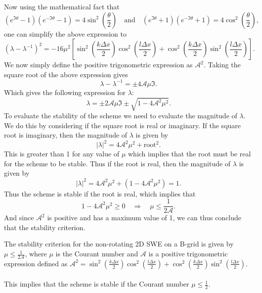 Now using the mathematical fact that 
\begin{equation}
    \left(e^{\mathfrak{I}\theta} - 1\right)\left(e^{-\mathfrak{I}\theta}-1\right) = 4\sin^2\left(\frac{\theta}{2}\right) \quad \text{and} \quad \left(e^{\mathfrak{I}\theta} + 1\right)\left(e^{-\mathfrak{I}\theta}+1\right) = 4\cos^2\left(\frac{\theta}{2}\right),
\end{equation}
one can simplify the above expression to
\begin{equation*}
(\lambda - \lambda^{-1})^2
= -16\mu^2 \left[
\sin^2\left(\frac{k\Delta x}{2}\right)\cos^2\left(\frac{l\Delta x}{2}\right)
+
\cos^2\left(\frac{k\Delta x}{2}\right)\sin^2\left(\frac{l\Delta x}{2}\right)
\right].
\end{equation*}
We now simply define the positive trigonometric expression as $\mathcal{A}^2$. 
Taking the square root of the above expression gives
\begin{equation*}
\lambda - \lambda^{-1} = \pm 4\mathcal{A}\mu \mathfrak{I}.
\end{equation*}
Which gives the following expression for $\lambda$:
\begin{equation*}
\lambda = \pm 2\mathcal{A}\mu \mathfrak{I} \pm \sqrt{1 - 4\mathcal{A}^2\mu^2}.
\end{equation*}
To evaluate the stability of the scheme we need to evaluate the magnitude of $\lambda$. We do this by considering if the square root is real or imaginary. If the square root is imaginary, then the magnitude of $\lambda$ is given by
\begin{equation*}
|\lambda|^2 = 4\mathcal{A}^2\mu^2 + \text{root}^2.
\end{equation*}
This is greater than 1 for any value of $\mu$ which implies that the root must be real for the scheme to be stable. Thus if the root is real, then the magnitude of $\lambda$ is given by
\begin{equation*}
|\lambda|^2 = 4\mathcal{A}^2\mu^2 + \left(1 - 4\mathcal{A}^2\mu^2\right) = 1.
\end{equation*}
Thus the scheme is stable if the root is real, which implies that
\begin{equation*}
    1 - 4\mathcal{A}^2\mu^2 \geq 0 \quad \Rightarrow \quad \mu \leq \frac{1}{2\mathcal{A}}.
\end{equation*}
And since $\mathcal{A}^2$ is positive and has a maximum value of 1, we can thus conclude that the stability criterion. 

\begin{answer}
    The stability criterion for the non-rotating 2D SWE on a B-grid is given by $\mu \leq \frac{1}{2\mathcal{A}}$, where $\mu$ is the Courant number and $\mathcal{A}$ is a positive trigonometric expression defined as $\mathcal{A}^2 = \sin^2\left(\frac{k\Delta x}{2}\right)\cos^2\left(\frac{l\Delta x}{2}\right) + \cos^2\left(\frac{k\Delta x}{2}\right)\sin^2\left(\frac{l\Delta x}{2}\right)$. 
    \\ $ $ \\
    This implies that the scheme is stable if the Courant number $\mu \leq \frac{1}{2}$.
\end{answer}